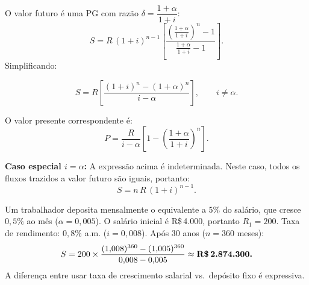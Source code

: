 O valor futuro é uma PG com razão $\delta = \dfrac{1+\alpha}{1+i}$:
\[
  S = R\,(1+i)^{n-1}\left[\frac{\left(\frac{1+\alpha}{1+i}\right)^n - 1}{\frac{1+\alpha}{1+i}-1}\right].
\]
Simplificando:
\begin{resultado}
\[
  S = R\left[\frac{(1+i)^n - (1+\alpha)^n}{i - \alpha}\right], \qquad i \neq \alpha.
\]
\end{resultado}

O valor presente correspondente é:
\[
  P = \frac{R}{i-\alpha}\left[1 - \left(\frac{1+\alpha}{1+i}\right)^n\right].
\]

\begin{nota}
\textbf{Caso especial $i = \alpha$:} A expressão acima é indeterminada. Neste caso, todos os fluxos trazidos a valor futuro são iguais, portanto:
\[
  S = n\,R\,(1+i)^{n-1}.
\]
\end{nota}

\begin{moderno}[title={Salários crescentes e poupança para aposentadoria}]
Um trabalhador deposita mensalmente o equivalente a $5\%$ do salário, que cresce $0{,}5\%$ ao mês ($\alpha = 0{,}005$). O salário inicial é R\$\,4.000, portanto $R_1 = 200$. Taxa de rendimento: $0{,}8\%$ a.m. ($i = 0{,}008$). Após 30 anos ($n = 360$ meses):
\[
  S = 200 \times \frac{(1{,}008)^{360} - (1{,}005)^{360}}{0{,}008 - 0{,}005}
    \approx \textbf{R\$\,2.874.300.}
\]
A diferença entre usar taxa de crescimento salarial vs.\ depósito fixo é expressiva.
\end{moderno}
